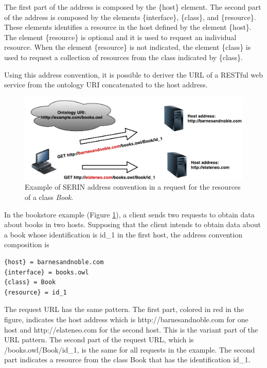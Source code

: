 \documentclass{singlecol-new}
\theoremstyle{TH}{
\newtheorem{lemma}{Lemma}
\newtheorem{theorem}[lemma]{Theorem}
\newtheorem{corrolary}[lemma]{Corrolary}
\newtheorem{conjecture}[lemma]{Conjecture}
\newtheorem{proposition}[lemma]{Proposition}
\newtheorem{claim}[lemma]{Claim}
\newtheorem{stheorem}[lemma]{Wrong Theorem}
\newtheorem{algorithm}{Algorithm}
}
\theoremstyle{THrm}{
\newtheorem{definition}{Definition}[section]
\newtheorem{question}{Question}[section]
\newtheorem{remark}{Remark}
\newtheorem{scheme}{Scheme}
}
\theoremstyle{THhit}{
\newtheorem{case}{Case}[section]
}
\begin{document}
The first part of the address is composed by the \{host\} element. 
The second part of the address is composed by the elements \{interface\}, \{class\}, and \{resource\}. These elements identifies a resource in the host defined by the element \{host\}.
The element \{resource\} is optional and it is used to request an individual resource.
When the element \{resource\} is not indicated, the element \{class\} is used to request a collection of resources from the class indicated by \{class\}.

Using this address convention, it is possible to deriver the URL of a RESTful web service from the ontology URI concatenated to the host address.  

\begin{figure}[!htb]
	\includegraphics[scale=.5]{images/bookstore-address-convention.pdf}
	\centering
	\caption{Example of SERIN address convention in a request for the resources of a class \textit{Book}.}
	\label{fig:bookstoreadrress}
\end{figure}

In the bookstore example (Figure \ref{fig:bookstoreadrress}), a client sends two requests to obtain data about books in two hosts. Supposing that the client intends to obtain data about a book whose identification is id\_1 in the first host, the address convention composition is

\begin{lstlisting}
{host} = barnesandnoble.com
{interface} = books.owl
{class} = Book
{resource} = id_1

\end{lstlisting}

The request URL has the same pattern. The first part, colored in red in the figure, indicates the host address which is http://barnesandnoble.com for one host and http://elateneo.com for the second host. This is the variant part of the URL pattern. The second part of the request URL, which is /books.owl/Book/id\_1, is the same for all requests in the example. The second part indicates a resource from the class Book that has the identification id\_1.
\end{document}
